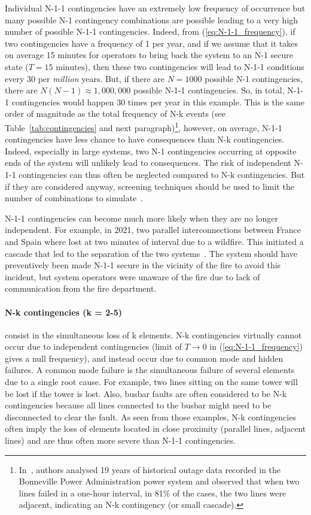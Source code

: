 Individual N-1-1 contingencies have an extremely low frequency of occurrence but many possible N-1 contingency combinations are possible leading to a very high number of possible N-1-1 contingencies. Indeed, from (\ref{eq:N-1-1_frequency}), if two contingencies have a frequency of 1 per year, and if we assume that it takes on average 15 minutes for operators to bring back the system to an N-1 secure state (\(T = 15 \text{ minutes}\)), then these two contingencies will lead to N-1-1 conditions every 30 per \emph{million} years. But, if there are \(N = 1000\) possible N-1 contingencies, there are \(N(N-1) \approx 1,000,000\) possible N-1-1 contingencies. So, in total, N-1-1 contingencies would happen 30 times per year in this example. This is the same order of magnitude as the total frequency of N-k events (see Table~\ref{tab:contingencies} and next paragraph)\footnote{In~\cite{ContingencyMotifs}, authors analysed 19 years of historical outage data recorded in the Bonneville Power Administration power system and observed that when two lines failed in a one-hour interval, in 81\% of the cases, the two lines were adjacent, indicating an N-k contingency (or small cascade).}, however, on average, N-1-1 contingencies have less chance to have consequences than N-k contingencies. Indeed, especially in large systems, two N-1 contingencies occurring at opposite ends of the system will unlikely lead to consequences. The risk of independent N-1-1 contingencies can thus often be neglected compared to N-k contingencies. But if they are considered anyway, screening techniques should be used to limit the number of combinations to simulate~\cite{VittalN-1-1}.

N-1-1 contingencies can become much more likely when they are no longer independent. For example, in 2021, two parallel interconnections between France and Spain where lost at two minutes of interval due to a wildfire. This initiated a cascade that led to the separation of the two systems~\cite{ENTSOEIbericSplit2021}. The system should have preventively been made N-1-1 secure in the vicinity of the fire to avoid this incident, but system operators were unaware of the fire due to lack of communication from the fire department.


\paragraph*{N-k contingencies (k = 2-5)} consist in the simultaneous loss of k elements. N-k contingencies virtually cannot occur due to independent contingencies (limit of \(T \to 0\) in (\ref{eq:N-1-1_frequency}) gives a null frequency), and instead occur due to common mode and hidden failures. A common mode failure is the simultaneous failure of several elements due to a single root cause. For example, two lines sitting on the same tower will be lost if the tower is lost. Also, busbar faults are often considered to be N-k contingencies because all lines connected to the busbar might need to be disconnected to clear the fault. As seen from those examples, N-k contingencies often imply the loss of elements located in close proximity (parallel lines, adjacent lines) and are thus often more severe than N-1-1 contingencies.

